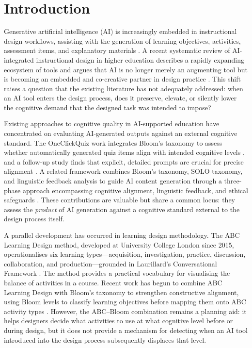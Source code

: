 \documentclass[journal,article,submit,pdftex,moreauthors]{Definitions/mdpi}
\begin{document}
\section{Introduction}

Generative artificial intelligence (AI) is increasingly embedded in instructional design workflows, assisting with the generation of learning objectives, activities, assessment items, and explanatory materials \cite{qian_hassan_2025}. A recent systematic review of AI-integrated instructional design in higher education describes a rapidly expanding ecosystem of tools and argues that AI is no longer merely an augmenting tool but is becoming an embedded and co-creative partner in design practice \cite{qian_hassan_2025}. This shift raises a question that the existing literature has not adequately addressed: when an AI tool enters the design process, does it preserve, elevate, or silently lower the cognitive demand that the designed task was intended to impose?

Existing approaches to cognitive quality in AI-supported education have concentrated on evaluating AI-generated outputs against an external cognitive standard. The OneClickQuiz work integrates Bloom's taxonomy to assess whether automatically generated quiz items align with intended cognitive levels \cite{yaacoub_oneclickquiz_2025}, and a follow-up study finds that explicit, detailed prompts are crucial for precise alignment \cite{yaacoub_prompt_2025}. A related framework combines Bloom's taxonomy, SOLO taxonomy, and linguistic feedback analysis to guide AI content generation through a three-phase approach encompassing cognitive alignment, linguistic feedback, and ethical safeguards \cite{ieee_enhancing_2025}. These contributions are valuable but share a common locus: they assess the \emph{product} of AI generation against a cognitive standard external to the design process itself.

A parallel development has occurred in learning design methodology. The ABC Learning Design method, developed at University College London since 2015, operationalises six learning types---acquisition, investigation, practice, discussion, collaboration, and production---grounded in Laurillard's Conversational Framework \cite{abcld_6types, young_perovic_2016, laurillard_2012}. The method provides a practical vocabulary for visualising the balance of activities in a course. Recent work has begun to combine ABC Learning Design with Bloom's taxonomy to strengthen constructive alignment, using Bloom levels to classify learning objectives before mapping them onto ABC activity types \cite{marstio_2025}. However, the ABC--Bloom combination remains a planning aid: it helps designers decide what activities to use at what cognitive level before or during design, but it does not provide a mechanism for detecting when an AI tool introduced into the design process subsequently displaces that level.
\end{document}

